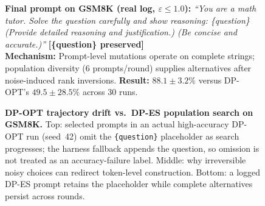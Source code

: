 \begin{figure}[!t]
\vspace{0.3em}

\begin{tcolorbox}[
    width=0.96\textwidth,
    colback=green!5!white,
    colframe=green!75!black,
    title={\textbf{DP-ES: Complete-Prompt Population Search}},
    fonttitle=\bfseries,
    sharp corners,
    boxrule=0.4pt,
    before skip=0pt,
    after skip=0pt,
    top=1mm,
    bottom=1mm,
]
\footnotesize
\textbf{Final prompt on GSM8K (real log, $\varepsilon{\leq}1.0$):} \textit{``You are a math tutor. Solve the question carefully and show reasoning: \textcolor{green!50!black}{\{question\}}\, (Provide detailed reasoning and justification.) (Be concise and accurate.)''} \quad \textcolor{green!50!black}{\textbf{[\{question\} preserved]}} \\[0.3em]
\textbf{Mechanism:} Prompt-level mutations operate on complete strings; population diversity (6 prompts/round) supplies alternatives after noise-induced rank inversions. \textbf{Result:} $88.1{\pm}3.2\%$ versus DP-OPT's $49.5{\pm}28.5\%$ across 30 runs.
\end{tcolorbox}

\vspace{0.8em}
\captionsetup{aboveskip=2pt,belowskip=0pt}
\caption{\textbf{DP-OPT trajectory drift vs.\ DP-ES population search on GSM8K.} Top: selected prompts in an actual high-accuracy DP-OPT run (seed~42) omit the \texttt{\{question\}} placeholder as search progresses; the harness fallback appends the question, so omission is not treated as an accuracy-failure label. Middle: why irreversible noisy choices can redirect token-level construction. Bottom: a logged DP-ES prompt retains the placeholder while complete alternatives persist across rounds.}
\label{fig:dpopt_failures_summary}
\endgroup
\vspace{-0.5em}
\end{figure}
